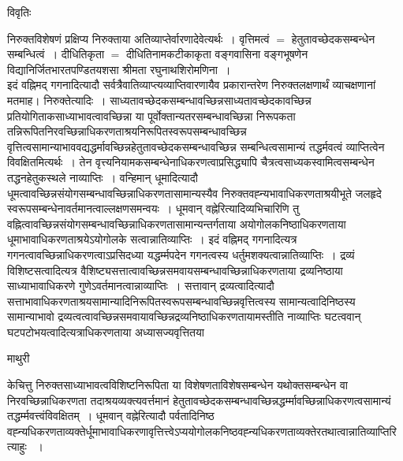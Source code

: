 \documentclass[10pt, openany]{book}
\begin{document}
{\begin{center}     विवृतिः \end{center}
निरुक्तविशेषणं प्रक्षिप्य निरुक्ताया अतिव्याप्तेर्वारणादेवेत्यर्थः~। वृत्तिमत्वं $=$ हेतुतावच्छेदकसम्बन्धेन सम्बन्धित्वं~। {\qt दीधितिकृता $=$ दीधितिनामकटीकाकृता } वङ्गवासिना वङ्गभूषणेन विद्यानिर्जितभारतपण्डितयशसा श्रीमता {\qt रघुनाथशिरोमणिना~}।\\

इदं वह्निमद् गगनादित्यादौ सर्वत्रैवातिव्याप्त्यव्याप्तिवारणायैव प्रकारान्तरेण निरुक्तलक्षणार्थं व्याचक्षणानां मतमाह। निरुक्तेत्यादिः~।
साध्यतावच्छेदकसम्बन्धावच्छिन्नसाध्यतावच्छेदकावच्छिन्न प्रतियोगिताकसाध्याभावत्वावच्छिन्ना या पूर्वोक्तान्यतरसम्बन्धावच्छिन्ना निरूपकता तन्निरूपितनिरवच्छिन्नाधिकरणताश्रयनिरूपितस्वरूपसम्बन्धावच्छिन्न वृत्तित्वसामान्याभाववद्यद्धर्मावच्छिन्नहेतुतावच्छेदकसम्बन्धावच्छिन्न सम्बन्धित्वसामान्यं तद्धर्मवत्वं व्याप्तित्वेन विवक्षितमित्यर्थः~। तेन वृत्त्यनियामकसम्बन्धेनाधिकरणत्वाप्रसिद्ध्यापि चैत्रत्वसाध्यकस्वामित्वसम्बन्धेन तद्धनहेतुकस्थले नाव्याप्तिः~। वन्हिमान् धूमादित्यादौ धूमत्वावच्छिन्नसंयोगसम्बन्धावच्छिन्नाधिकरणतासामान्यस्यैव निरुक्तवह्न्यभावाधिकरणताश्रयीभूते जलहृदे स्वरूपसम्बन्धेनावर्तमानत्वाल्लक्षणसमन्वयः~। धूमवान् वह्नेरित्यादिव्यभिचारिणि तु वह्नित्वावच्छिन्नसंयोगसम्बन्धावच्छिन्नाधिकरणतासामान्यन्तर्गताया अयोगोलकनिष्ठाधिकरणताया धूमाभावाधिकरणताश्रयेऽयोगोलके सत्वान्नातिव्याप्तिः~। इदं वह्निमद् गगनादित्यत्र गगनत्वावच्छिन्नाधिकरणत्वाऽप्रसिदध्या यद्धर्म्मपदेन गगनत्वस्य धर्तुमशक्यत्वान्नातिव्याप्तिः~। द्रव्यं विशिष्टसत्वादित्यत्र
वैशिष्ट्यसत्तात्वावच्छिन्नसमवायसम्बन्धावच्छिन्नाधिकरणताया द्रव्यनिष्ठाया साध्याभावाधिकरणे गुणेऽवर्तमानत्वान्नाव्याप्तिः~। सत्तावान् द्रव्यत्वादित्यादौ सत्ताभावाधिकरणताश्रयसामान्यादिनिरूपितस्वरूपसम्बन्धावच्छिन्नवृत्तित्वस्य सामान्यत्वादिनिष्ठस्य सामान्याभावो द्रव्यत्वत्वावच्छिन्नसमवायावच्छिन्नद्रव्यनिष्ठाधिकरणतायामस्तीति नाव्याप्तिः घटत्ववान् घटपटोभयत्वादित्यत्राधिकरणताया अध्यासज्यवृत्तितया
\newpage
\begin{center}  माथुरी  \end{center}
{\la केचित्तु  निरुक्तसाध्याभावत्वविशिष्टनिरूपिता या विशेषणताविशेषसम्बन्धेन  यथोक्तसम्बन्धेन वा निरवच्छिन्नाधिकरणता तदाश्रयव्यक्त्यवर्त्तमानं  हेतुतावच्छेदकसम्बन्धावच्छिन्नद्धर्म्मावच्छिन्नाधिकरणत्वसामान्यं तद्धर्म्मवत्त्वंविवक्षितम्~। धूमवान् वह्नेरित्यादौ पर्वतादिनिष्ठ वह्न्यधिकरणताव्यक्तेर्धूमाभावाधिकरणावृत्तित्त्वेऽप्ययोगोलकनिष्ठवह्न्यधिकरणताव्यक्तेरतथात्वान्नातिव्याप्तिरित्याहुः ~।\\

}}
\end{document}
